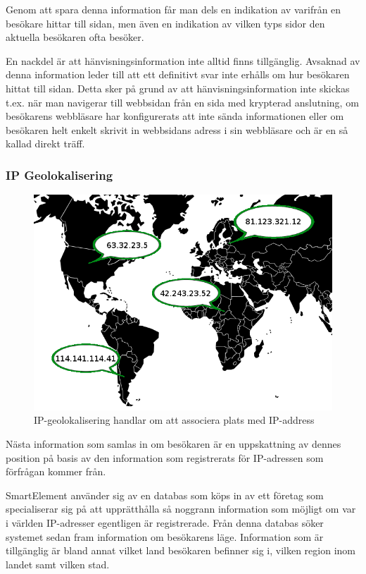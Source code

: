 Genom att spara denna information får man dels en indikation av varifrån en besökare hittar till sidan, men även en indikation av vilken typs sidor den aktuella besökaren ofta besöker.

En nackdel är att hänvisningsinformation inte alltid finns tillgänglig. Avsaknad av denna information leder till att ett definitivt svar inte erhålls om hur besökaren hittat till sidan. Detta sker på grund av att hänvisningsinformation inte skickas t.ex. när man navigerar till webbsidan från en sida med krypterad anslutning, om besökarens webbläsare har konfigurerats att inte sända informationen eller om besökaren helt enkelt skrivit in webbsidans adress i sin webbläsare och är en så kallad direkt träff. \citep{httprfc}

\subsubsection{IP Geolokalisering}

\begin{figure}[h!]
\centering
\includegraphics[width=120mm]{assets/images/geolocation.png}
\caption{IP-geolokalisering handlar om att associera plats med IP-address}
\label{geolocation}
\end{figure}

Nästa information som samlas in om besökaren är en uppskattning av dennes position på basis av den information som registrerats för IP-adressen som förfrågan kommer från.

SmartElement använder sig av en databas som köps in av ett företag som specialiserar sig på att upprätthålla så noggrann information som möjligt om var i världen IP-adresser egentligen är registrerade. Från denna databas söker systemet sedan fram information om besökarens läge. Information som är tillgänglig är bland annat vilket land besökaren befinner sig i, vilken region inom landet samt vilken stad.

